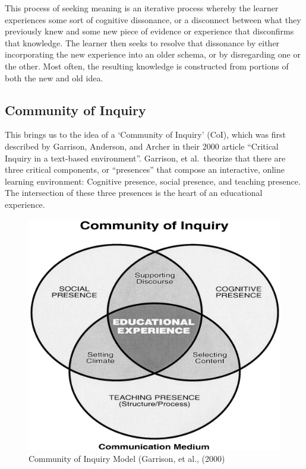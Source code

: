 \documentclass[
]{book}
\begin{document}
This process of seeking meaning is an iterative process whereby the learner experiences some sort of cognitive dissonance, or a disconnect between what they previously knew and some new piece of evidence or experience that disconfirms that knowledge. The learner then seeks to resolve that dissonance by either incorporating the new experience into an older schema, or by disregarding one or the other. Most often, the resulting knowledge is constructed from portions of both the new and old idea.

\hypertarget{community-of-inquiry}{%
\subsection*{Community of Inquiry}\label{community-of-inquiry}}

This brings us to the idea of a `Community of Inquiry' (CoI), which was first described by Garrison, Anderson, and Archer in their 2000 article ``Critical Inquiry in a text-based environment''. Garrison, et al.~theorize that there are three critical components, or ``presences'' that compose an interactive, online learning environment: Cognitive presence, social presence, and teaching presence. The intersection of these three presences is the heart of an educational experience.

\begin{figure}
\centering
\includegraphics{assets/u2/CoI-Model.jpg}
\caption{Community of Inquiry Model (Garrison, et al., (2000)}
\end{figure}
\end{document}
